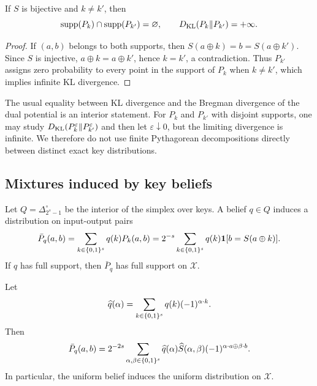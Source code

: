 \begin{proposition}\label{prop:kl-keys}
If $S$ is bijective and $k\neq k'$, then
\begin{equation}\label{eq:kl-infinite}
  \operatorname{supp}(P_k)\cap\operatorname{supp}(P_{k'})=\varnothing,
  \qquad
  D_{\mathrm{KL}}(P_k\|P_{k'})=+\infty.
\end{equation}
\end{proposition}

\begin{proof}
If $(a,b)$ belongs to both supports, then
$S(a\oplus k)=b=S(a\oplus k')$.  Since $S$ is injective,
$a\oplus k=a\oplus k'$, hence $k=k'$, a contradiction.  Thus $P_{k'}$ assigns
zero probability to every point in the support of $P_k$ when $k\neq k'$, which
implies infinite KL divergence.
\end{proof}

\begin{remark}
The usual equality between KL divergence and the Bregman divergence of the dual
potential is an interior statement.  For $P_k$ and $P_{k'}$ with disjoint
supports, one may study
$D_{\mathrm{KL}}(P_k^\varepsilon\|P_{k'}^\varepsilon)$ and then let
$\varepsilon\downarrow0$, but the limiting divergence is infinite.  We therefore
do not use finite Pythagorean decompositions directly between distinct exact
key distributions.
\end{remark}

\subsection{Mixtures induced by key beliefs}\label{subsec:belief-mixture}

Let $Q=\Delta_{2^s-1}^{\circ}$ be the interior of the simplex over keys.  A
belief $q\in Q$ induces a distribution on input-output pairs
\begin{equation}\label{eq:mixture-belief}
  \bar P_q(a,b)=\sum_{k\in\{0,1\}^{s}}q(k)P_k(a,b)
  =2^{-s}\sum_{k\in\{0,1\}^{s}}q(k)\mathbf 1[b=S(a\oplus k)].
\end{equation}
If $q$ has full support, then $\bar P_q$ has full support on $\mathcal X$.

\begin{proposition}\label{prop:belief-walsh}
Let
\[
  \widehat q(\alpha)=\sum_{k\in\{0,1\}^{s}}q(k)(-1)^{\alpha\cdot k}.
\]
Then
\begin{equation}\label{eq:belief-walsh}
  \bar P_q(a,b)
  =2^{-2s}\sum_{\alpha,\beta\in\{0,1\}^{s}}
  \widehat q(\alpha)\widehat S(\alpha,\beta)
  (-1)^{\alpha\cdot a\oplus\beta\cdot b}.
\end{equation}
In particular, the uniform belief induces the uniform distribution on
$\mathcal X$.
\end{proposition}

